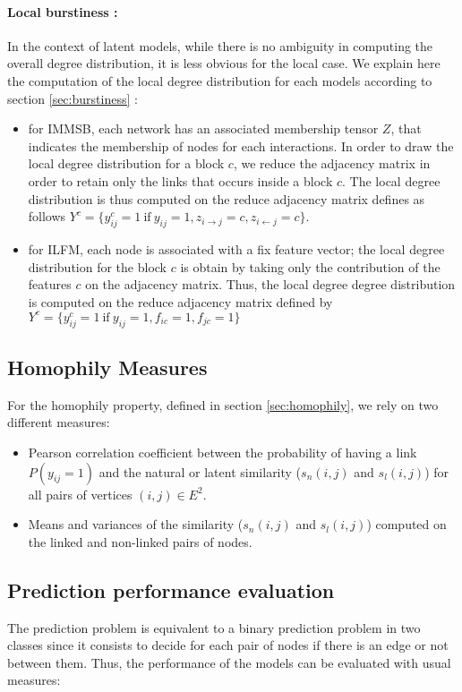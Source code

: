 \paragraph{Local burstiness : }
In the context of latent models, while there is no ambiguity in computing the overall degree distribution, it is less obvious for the local case. We explain here the computation of the local degree distribution for each models according to section \ref{sec:burstiness} :
\begin{itemize}
        \item for IMMSB, each network has an associated membership tensor $Z$, that indicates the membership of nodes for each  interactions. In order to draw the local degree distribution for a block $c$, we reduce the adjacency matrix in order to retain only the links that occurs inside a block $c$. The local degree distribution is thus computed on the reduce adjacency matrix defines as follows $Y^c =\{ y_{ij}^c=1 \ \textrm{if}\ y_{ij}=1 , z_{i\rightarrow j}=c, z_{i\leftarrow j}=c\}$.
        \item for ILFM, each node is associated with a fix feature vector; the local degree distribution for the block $c$ is obtain by taking only the contribution of the features $c$ on the adjacency matrix. Thus, the local degree degree distribution is computed on the reduce adjacency matrix defined by $Y^c =\{ y_{ij}^c=1 \ \textrm{if}\ y_{ij}=1 , f_{ic}=1, f_{jc}=1\}$
\end{itemize}

\subsection{Homophily Measures}

For the homophily property, defined in section \ref{sec:homophily}, we rely on two different measures:

\begin{itemize}
    \item  Pearson correlation coefficient between the probability of having a link $P(y_{ij}=1)$  and the natural or latent similarity ($s_n(i,j)$ and $s_l(i,j)$) for all pairs of vertices $(i,j) \in E^2 $. 
    \item  Means and variances of the similarity ($s_n(i,j)$ and $s_l(i,j)$) computed on the linked and non-linked pairs of nodes.
\end{itemize}

\subsection{Prediction performance evaluation}
The prediction problem is equivalent to a binary prediction problem in two classes since it consists to decide for each pair of nodes if there is an edge or not between them. 
Thus, the performance of the models can be evaluated with usual measures:

